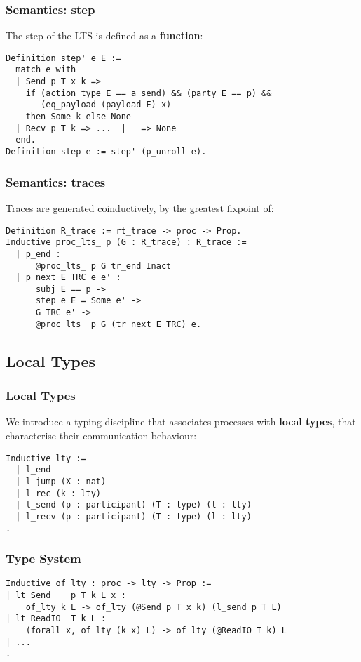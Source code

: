 \begin{frame}[fragile]
    \frametitle{Semantics: step}
The step of the LTS is defined as a \textbf{function}:
\vspace{.5cm}
    \begin{verbatim}
Definition step' e E :=
  match e with
  | Send p T x k =>
    if (action_type E == a_send) && (party E == p) &&
       (eq_payload (payload E) x)
    then Some k else None
  | Recv p T k => ...  | _ => None
  end.
Definition step e := step' (p_unroll e).
    \end{verbatim}
\end{frame}

\begin{frame}[fragile]
    \frametitle{Semantics: traces}
Traces are generated coinductively, by the greatest fixpoint of:
\vspace{.5cm}
    \begin{verbatim}
Definition R_trace := rt_trace -> proc -> Prop.
Inductive proc_lts_ p (G : R_trace) : R_trace :=
  | p_end :
      @proc_lts_ p G tr_end Inact
  | p_next E TRC e e' :
      subj E == p ->
      step e E = Some e' ->
      G TRC e' ->
      @proc_lts_ p G (tr_next E TRC) e.
    \end{verbatim}
\end{frame}

\subsection{Local Types}

\begin{frame}[fragile]
    \frametitle{Local Types}
    We introduce a typing discipline that associates processes with \textbf{local types}, that 
characterise their communication behaviour:

    \begin{verbatim}
Inductive lty :=
  | l_end
  | l_jump (X : nat)
  | l_rec (k : lty)
  | l_send (p : participant) (T : type) (l : lty)
  | l_recv (p : participant) (T : type) (l : lty)
.
    \end{verbatim}
\end{frame}

\begin{frame}[fragile]
    \frametitle{Type System}
    \begin{verbatim}
Inductive of_lty : proc -> lty -> Prop :=
| lt_Send    p T k L x :
    of_lty k L -> of_lty (@Send p T x k) (l_send p T L)
| lt_ReadIO  T k L :
    (forall x, of_lty (k x) L) -> of_lty (@ReadIO T k) L
| ...
.
    \end{verbatim}
\end{frame}

